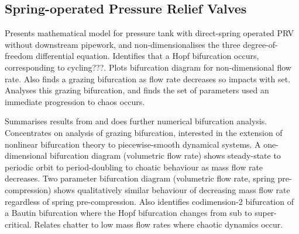 \subsection{Spring-operated Pressure Relief Valves}

\cite{LicskoNonlinearValve}
Presents mathematical model for pressure tank with direct-spring operated PRV without downstream pipework, and non-dimensionalises the three degree-of-freedom differential equation. Identifies that a Hopf bifurcation occurs, corresponding to cycling???. Plots bifurcation diagram for non-dimensional flow rate. Also finds a grazing bifurcation as flow rate decreases so impacts with set. Analyses this grazing bifurcation, and finds the set of parameters used an immediate progression to chaos occurs.

\cite{Hos2012GrazingModel}
Summarises results from \cite{LicskoNonlinearValve} and does further numerical bifurcation analysis. Concentrates on analysis of grazing bifurcation, interested in the extension of nonlinear bifurcation theory to piecewise-smooth dynamical systems. A one-dimensional bifurcation diagram (volumetric flow rate) shows steady-state to periodic orbit to period-doubling to choatic behaviour as mass flow rate decreases. Two parameter bifurcation diagram (volumetric flow rate, spring pre-compression) shows qualitatively similar behaviour of decreasing mass flow rate regardless of spring pre-compression. Also identifies codimension-2 bifurcation of a Bautin bifurcation where the Hopf bifurcation changes from sub to super-critical. Relates chatter to low mass flow rates where chaotic dynamics occur.

\cite{Darby2013TheModel}

\cite{Bazso2013AnValve}

